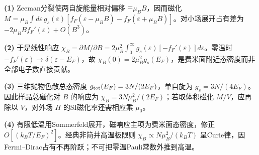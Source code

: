 \par\noindent\textbf{(1)} Zeeman分裂使两自旋能量相对偏移 \(\mp\mu_BB\)，因而磁化 \(M=\mu_B\int d\varepsilon\,g_s(\varepsilon)[f_F(\varepsilon-\mu_BB)-f_F(\varepsilon+\mu_BB)]\)。对小场展开占有差为 \(-2\mu_BB f_F'(\varepsilon)+O(B^3)\)。
\par\noindent\textbf{(2)} 于是线性响应 \(\chi_B=\partial M/\partial B=2\mu_B^2\int_0^\infty g_s(\varepsilon)[-f_F'(\varepsilon)]d\varepsilon\)。零温时 \(-f_F'(\varepsilon)\to\delta(\varepsilon-E_F)\)，故 \(\chi_B(0)=2\mu_B^2g_s(E_F)\)，是费米面附近态密度而非全部电子数直接贡献。
\par\noindent\textbf{(3)} 三维抛物色散总态密度 \(g_{\rm tot}(E_F)=3N/(2E_F)\)，单自旋为 \(g_s=3N/(4E_F)\)。因此样品总磁化对 \(B\) 的响应为 \(\chi_B=3N\mu_B^2/(2E_F)\)；若取体积磁化 \(M/V\)，应再除以 \(V\)，对外场 \(H\) 的SI磁化率还需相应乘 \(\mu_0\)。
\par\noindent\textbf{(4)} 有限低温用Sommerfeld展开，磁响应主项为费米面态密度，修正 \(O[(k_BT/E_F)^2]\)。经典非简并高温极限则 \(\chi_B\propto N\mu_B^2/(k_BT)\) 呈Curie律，因Fermi–Dirac占有不再阶跃；不可把零温Pauli常数外推到高温。
